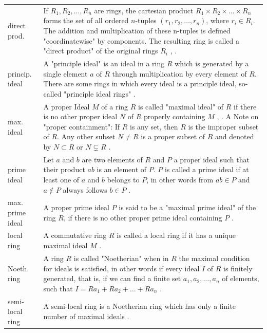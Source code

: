 \documentclass[12pt]{amsart}
\theoremstyle{definition}
\begin{document}
{\renewcommand{\arraystretch}{1.8}
\begin{table}[H]
	\centering
	\begin{tabular}{|P{1.4cm} p{13.4cm}|}
		\hline
		direct prod. & If $R_1,R_2,\ldots,R_n$ are rings, the cartesian product $R_1\times R_2\times\ldots\times R_n$ forms the set of all ordered $n$-tuples $(r_1,r_2,\ldots,r_n)$, where $r_i\in R_i$. The addition and multiplication of these n-tuples is defined "coordinatewise" by components. The resulting ring is called a "direct product" of the original rings $R_i$ \cite[p.~51]{Ref_Wolfart_2011}, \cite[p.~169]{Ref_Fraleigh_2014}.
		\\
		princip. ideal & A "principle ideal" is an ideal in a ring $R$ which is generated by a single element $a$ of $R$ through multiplication by every element of $R$. There are some rings in which every ideal is a principle ideal, so-called "principle ideal rings" \cite[p.~68]{Ref_Wolfart_2011}.
		\\
		max. ideal & A proper Ideal $M$ of a ring $R$ is called "maximal ideal" of $R$  if there is no other proper ideal $N$ of $R$ properly containing $M$ \cite[p.~247]{Ref_Fraleigh_2014}, \cite[p.~37]{Ref_Northcott_1953}. A Note on "proper containment": If $R$ is any set, then $R$ is the improper subset of $R$. Any other subset $N\ne R$ is a proper subset of $R$ and denoted by $N\subset R$ or $N\varsubsetneq R$ \cite[p.~2]{Ref_Fraleigh_2014}.
		\\
		prime ideal & Let $a$ and $b$ are two elements of $R$ and $P$ a proper ideal such that their product $ab$ is an element of $P$. $P$ is called a prime ideal if at least one of $a$ and $b$ belongs to $P$, in other words from $ab\in P$ and $a\notin P$ always follows $b\in P$ \cite[p.~9]{Ref_Northcott_1953}.
		\\
		max. prime ideal & A proper prime ideal $P$ is said to be a "maximal prime ideal" of the ring $R$, if there is no other proper prime ideal containing $P$ \cite[p.~23]{Ref_Northcott_1953}.
		\\
		local ring & A commutative ring $R$ is called a local ring if it has a unique maximal ideal $M$ \cite[p.~522]{Ref_Rotman_2005}.
		\\
		Noeth. ring & A ring $R$ is called "Noetherian" when in $R$ the maximal condition for ideals is satisfied, in other words if every ideal $I$ of $R$ is finitely generated, that is, if we can find a finite set $a_1,a_2,\ldots,a_n$ of elements, such that $I=Ra_1+Ra_2+\ldots+Ra_n$ \cite[p.~19, 101]{Ref_Northcott_1953}.
		\\
		semi-local ring & A semi-local ring is a Noetherian ring which has only a finite number of maximal ideals \cite[p.~107]{Ref_Northcott_1953}.
		\\ \hline
	\end{tabular}
\end{table}}
\end{document}
